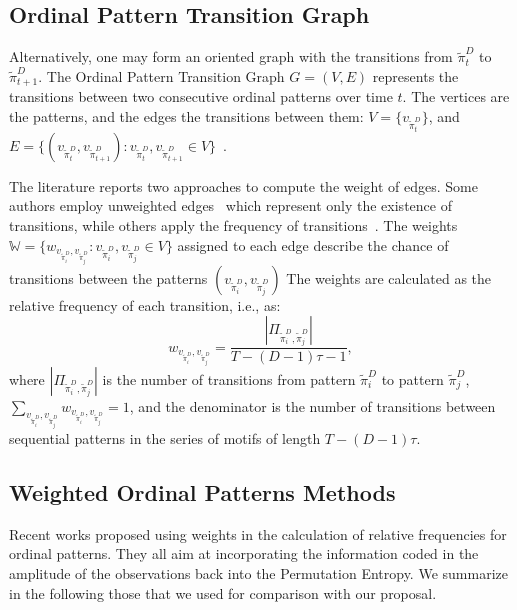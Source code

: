 \documentclass[journal]{IEEEtran}
\begin{document}
\subsection{Ordinal Pattern Transition Graph}\label{OPTG}

Alternatively, one may form an oriented graph with the transitions from $\widetilde\pi_t^D$ to $\widetilde\pi_{t+1}^D$. 
The Ordinal Pattern Transition Graph ${G} = ({V}, {E})$ 
represents the transitions between two consecutive ordinal patterns over time $t$.
The vertices are the patterns, and the edges the transitions between them:
$V = \{v_{\widetilde\pi_t^D}\}$, and 
$E = \{(v_{\widetilde\pi_t^D}, v_{\widetilde\pi_{t+1}^D}): v_{\widetilde\pi_t^D}, v_{\widetilde\pi_{t+1}^D} \in V \}$~\cite{Borges2019Transition}.

The literature reports two approaches to compute the weight of edges.
Some authors employ unweighted edges~\cite{McCullough2015lagged,Kulp2016ordinal} which represent only the existence of transitions, while others apply the frequency of transitions~\cite{Sorrentino2015periodic,Zhang2017ConstructingOP}.
The weights $\mathbb{W} = \{w_{v_{\widetilde{\pi}^D_i}, v_{\widetilde\pi^D_j}}: v_{\widetilde\pi^D_i}, v_{\widetilde\pi^D_j} \in V \}$ assigned to each edge describe the chance of transitions between the patterns $(v_{\widetilde\pi^D_i}, v_{\widetilde\pi^D_j})$
The weights are calculated as the relative frequency of each transition, i.e., as:
\begin{equation}
w_{v_{\widetilde\pi^D_i}, v_{\widetilde\pi^D_j}} = \frac{|\Pi_{\widetilde\pi^D_i,\widetilde\pi^D_j}|}{T-(D-1)\tau-1},
\end{equation}
where $|\Pi_{\widetilde\pi^D_i,\widetilde\pi^D_j}|$ is the number of transitions from pattern $\widetilde\pi^D_i$ to pattern $\widetilde\pi^D_j$, $\sum_{v_{\widetilde\pi^D_i}, v_{\widetilde\pi^D_j}}w_{v_{\widetilde\pi^D_i}, v_{\widetilde\pi^D_j}} = 1$,
and the denominator is the number of transitions between sequential patterns in the series of motifs of length $T-(D-1)\tau$.

\subsection{Weighted Ordinal Patterns Methods}\label{Methods}

Recent works proposed using weights in the calculation of relative frequencies for ordinal patterns.
They all aim at incorporating the information coded in the amplitude of the observations back into the Permutation Entropy.
We summarize in the following those that we used for comparison with our proposal.
\end{document}
